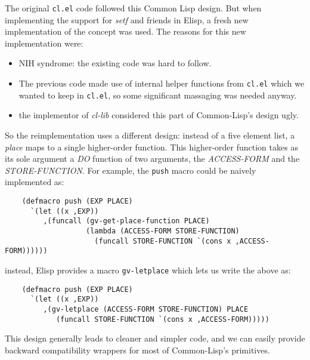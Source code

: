 \documentclass[format=acmsmall, review=false, screen=true]{acmart}
\newcommand \Elisp {Elisp}
\begin{document}
The original \texttt{cl.el} code followed this Common Lisp design.  But when
implementing the support for \emph{setf} and friends in \Elisp{}, a fresh
new implementation of the concept was used.  The reasons for this new
implementation were:
\begin{itemize}
\item NIH syndrome: the existing code was hard to follow.
\item The previous code made use of internal helper functions from
  \texttt{cl.el} which we wanted to keep in \texttt{cl.el}, so some
  significant massaging was needed anyway.
\item the implementor of \emph{cl-lib} considered this part of Common-Lisp's
  design ugly.
\end{itemize}

So the reimplementation uses a different design: instead of a five element
list, a \emph{place} maps to a single higher-order function.
This higher-order function takes as its sole argument a \textsl{DO} function
of two arguments, the \textsl{ACCESS-FORM} and the \textsl{STORE-FUNCTION}.
For example, the \texttt{push} macro could be naively implemented as:
\begin{verbatim}
    (defmacro push (EXP PLACE)
      `(let ((x ,EXP))
         ,(funcall (gv-get-place-function PLACE)
                   (lambda (ACCESS-FORM STORE-FUNCTION)
                     (funcall STORE-FUNCTION `(cons x ,ACCESS-FORM))))))
\end{verbatim}
instead, \Elisp{} provides a macro \texttt{gv-letplace} which lets us
write the above as:
\begin{verbatim}
    (defmacro push (EXP PLACE)
      `(let ((x ,EXP))
         ,(gv-letplace (ACCESS-FORM STORE-FUNCTION) PLACE
            (funcall STORE-FUNCTION `(cons x ,ACCESS-FORM)))))
\end{verbatim}
This design generally leads to cleaner and simpler code, and we can easily
provide backward compatibility wrappers for most of Common-Lisp's
primitives.
\end{document}
